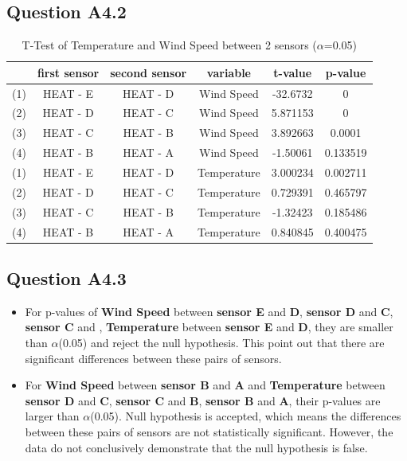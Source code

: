 \documentclass[a4paper]{article}
\begin{document}
\subsection{Question A4.2}
\begin{table}[H]
  \centering
  \caption{T-Test of Temperature and Wind Speed between 2 sensors ($\alpha$=0.05)}
    \begin{tabular}{cccccc}
    \toprule
          & first sensor & second sensor & variable & t-value & p-value \\
    \midrule
    (1)   & HEAT - E & HEAT - D & Wind Speed & -32.6732 & 0 \\
    (2)   & HEAT - D & HEAT - C & Wind Speed & 5.871153 & 0 \\
    (3)   & HEAT - C & HEAT - B & Wind Speed & 3.892663 & 0.0001 \\
    (4)   & HEAT - B & HEAT - A & Wind Speed & -1.50061 & \cellcolor[rgb]{ .929,  .698,  .549}0.133519 \\
    (1)   & HEAT - E & HEAT - D & Temperature & 3.000234 & 0.002711 \\
    (2)   & HEAT - D & HEAT - C & Temperature & 0.729391 & \cellcolor[rgb]{ .929,  .698,  .549}0.465797 \\
    (3)   & HEAT - C & HEAT - B & Temperature & -1.32423 & \cellcolor[rgb]{ .929,  .698,  .549}0.185486 \\
    (4)   & HEAT - B & HEAT - A & Temperature & 0.840845 & \cellcolor[rgb]{ .929,  .698,  .549}0.400475 \\
    \bottomrule
    \end{tabular}%
  \label{tab:addlabel}%
\end{table}%


\subsection{Question A4.3}
\begin{itemize}
    \item For p-values of \textbf{Wind Speed} between \textbf{sensor E} and \textbf{D}, \textbf{sensor D} and \textbf{C}, \textbf{sensor C} and , \textbf{Temperature} between \textbf{sensor E} and \textbf{D}, they are smaller than $\alpha$(0.05) and reject the null hypothesis. This point out that there are significant differences between these pairs of sensors.
    \item For \textbf{Wind Speed} between \textbf{sensor B} and \textbf{A} and \textbf{Temperature} between \textbf{sensor D} and \textbf{C}, \textbf{sensor C} and \textbf{B}, \textbf{sensor B} and \textbf{A}, their p-values are larger than $\alpha$(0.05). Null hypothesis is accepted, which means the differences between these pairs of sensors are not statistically significant. However, the data do not conclusively demonstrate that the null hypothesis is false.
\end{itemize}
\end{document}
